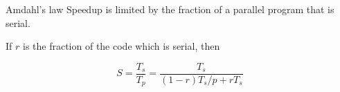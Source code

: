 \documentclass[10pt, t]{beamer}
\begin{document}
  \begin{frame}{Amdahl's law}
    Speedup is limited by the fraction of a parallel program that is serial.

    If $r$ is the fraction of the code which is serial, then

    \[
      S=\frac{T_s}{T_p}=\frac{T_s}{(1 - r) T_s/p + rT_s}
    \]

    \vspace{-2ex}
    \begin{center}
    \end{center}

  \end{frame}
\end{document}
